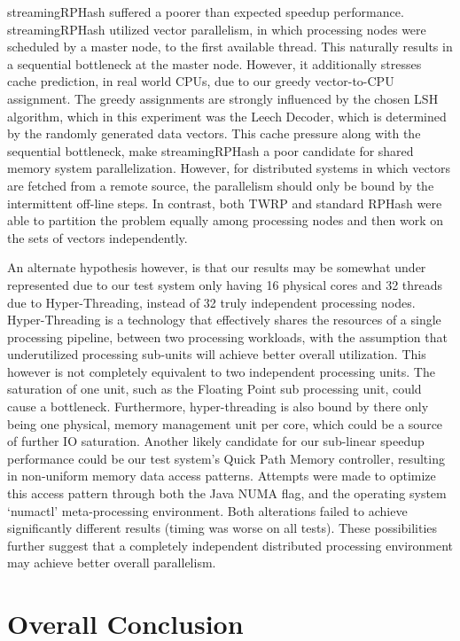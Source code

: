 \textsf{streamingRPHash} suffered a poorer than expected speedup performance.
\textsf{streamingRPHash} utilized vector parallelism, in which processing nodes were scheduled by a
master node, to the first available thread.  This naturally results in a sequential bottleneck at
the master node.  However, it additionally stresses cache prediction, in real world CPUs, due to our
greedy vector-to-CPU assignment.  The greedy assignments are strongly influenced by the chosen LSH
algorithm, which in this experiment was the Leech Decoder, which is determined by the randomly
generated data vectors.  This cache pressure along with the sequential bottleneck, make
\textsf{streamingRPHash} a poor candidate for shared memory system parallelization.  However, for
distributed systems in which vectors are fetched from a remote source, the parallelism should only
be bound by the intermittent off-line steps.  In contrast, both \textsf{TWRP} and standard \textsf{RPHash} were able to
partition the problem equally among processing nodes and then work on the sets of vectors
independently.

An alternate hypothesis however, is that our results may be somewhat under represented due to our
test system only having 16 physical cores and 32 threads due to Hyper-Threading, instead of 32
truly independent processing nodes.  Hyper-Threading is a technology that effectively shares the
resources of a single processing pipeline, between two processing workloads, with the assumption
that underutilized processing sub-units will achieve better overall utilization.  This however is not
completely equivalent to two independent processing units.  The saturation of one unit, such as the
Floating Point sub processing unit, could cause a bottleneck.  Furthermore, hyper-threading is also
bound by there only being one physical, memory management unit per core, which could be a source of
further IO saturation.  Another likely candidate for our sub-linear speedup performance could be our
test system's Quick Path Memory controller, resulting in non-uniform memory data access patterns.
Attempts were made to optimize this access pattern through both the Java NUMA flag, and the
operating system `numactl' meta-processing environment.  Both alterations failed to achieve
significantly different results (timing was worse on all tests).  These possibilities further
suggest that a completely independent distributed processing environment may achieve better overall
parallelism.

\section{Overall Conclusion}

